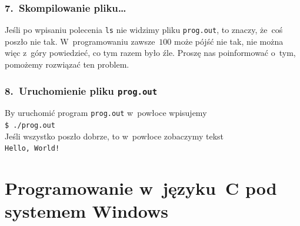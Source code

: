 \documentclass[10pt,t]{beamer}
\begin{document}
\begin{frame}
  \frametitle{7.~Skompilowanie pliku\ldots}


  Jeśli po wpisaniu polecenia \texttt{ls} nie widzimy pliku
  \texttt{prog.out}, to znaczy, że~coś poszło nie tak. W~programowaniu
  zawsze~$100$ może pójść nie tak, nie można więc z~góry powiedzieć,
  co tym razem było źle. Proszę nas poinformować o~tym, pomożemy
  rozwiązać ten problem.

\end{frame}





\begin{frame}
  \frametitle{8.~Uruchomienie pliku \texttt{prog.out}}


  By uruchomić program \texttt{prog.out} w~powłoce wpisujemy \\
  \texttt{\$ ./prog.out} \\
  Jeśli wszystko poszło dobrze, to w~powłoce zobaczymy tekst \\
  \texttt{Hello, World!}

\end{frame}










\section{Programowanie w~języku~C pod systemem Windows}
\end{document}
